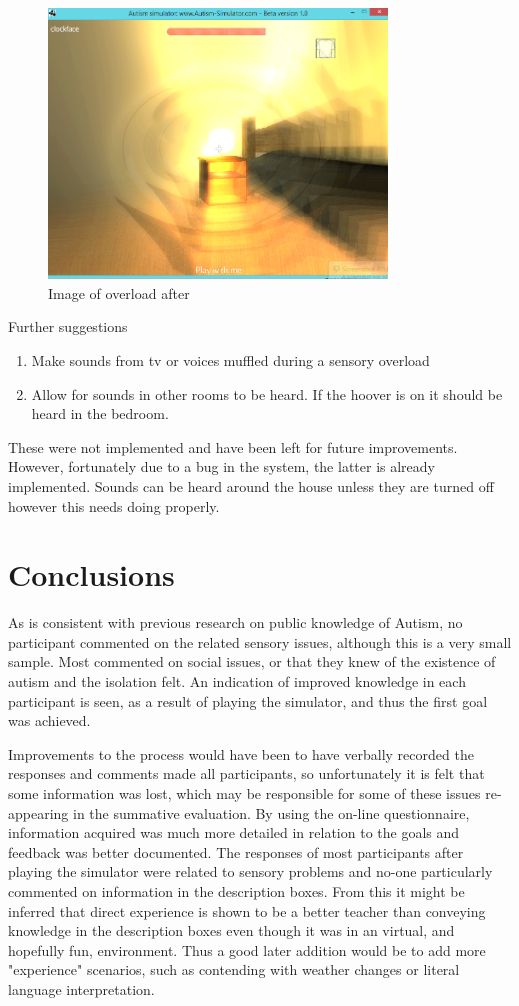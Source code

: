 \documentclass[11pt]{report}
\begin{document}
\begin{figure}[H]
\centering
\includegraphics[width=90mm]{images/implementationfirst/gameimages/overloadbedroom_afterconsultation.png}
\caption{Image of overload after}
\label{old_house}
\end{figure}

Further suggestions
\begin{enumerate}
\item Make sounds from tv or voices muffled during a sensory overload
\item Allow for sounds in other rooms to be heard. If the hoover is on it should be heard in the bedroom.
\end{enumerate}

These were not implemented and have been left for future improvements. However, fortunately due to a bug in the system, the latter is already implemented. Sounds can be heard around the house unless they are turned off however this needs doing properly.


\section{Conclusions}
As is consistent with previous research on public knowledge of Autism, no participant commented on the related sensory issues, although this is a very small sample. Most commented on social issues, or that they knew of the existence of autism and the isolation felt. An indication of improved knowledge in each participant is seen, as a result of playing the simulator, and thus the first goal was achieved. 

Improvements to the process would have been to have verbally recorded the responses and comments made all participants, so unfortunately it is felt that some information was lost, which may be responsible for some of these issues re-appearing in the summative evaluation. By using the on-line questionnaire, information acquired was much more detailed in relation to the goals and feedback was better documented. The responses of most participants after playing the simulator were related to sensory problems and no-one particularly commented on information in the description boxes. From this it might be inferred that direct experience is shown to be a better teacher than conveying knowledge in the description boxes even though it was in an virtual, and hopefully fun, environment. Thus a good later addition would be to add more "experience" scenarios, such as contending with weather changes or literal language interpretation.  
\end{document}
